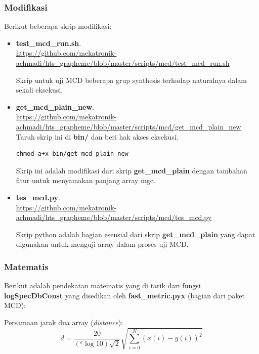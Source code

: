 \documentclass[12pt,]{article}
\begin{document}
	\newpage
	\subsubsection{Modifikasi}

	Berikut beberapa skrip modifikasi:
	\begin{itemize}
		\item \textbf{test\_mcd\_run.sh}.\\
		\url{https://github.com/mekatronik-achmadi/hts_grapheme/blob/master/scripts/mcd/test_mcd_run.sh}

		Skrip untuk uji MCD beberapa grup synthesis terhadap naturalnya dalam sekali eksekusi.

		\item \textbf{get\_mcd\_plain\_new}.\\
		\url{https://github.com/mekatronik-achmadi/hts_grapheme/blob/master/scripts/mcd/get_mcd_plain_new}
		Taruh skrip ini di \textbf{bin/} dan beri hak akses eksekusi.

		\begin{verbatim}
chmod a+x bin/get_mcd_plain_new
		\end{verbatim}

		Skrip ini adalah modifikasi dari skrip \textbf{get\_mcd\_plain} dengan tambahan fitur untuk menyamakan panjang array mgc.

		\item \textbf{tes\_mcd.py}.\\
		\url{https://github.com/mekatronik-achmadi/hts_grapheme/blob/master/scripts/mcd/tes_mcd.py}

		Skrip python adalah bagian esensial dari skrip \textbf{get\_mcd\_plain} yang dapat digunakan untuk menguji array dalam proses uji MCD.

	\end{itemize}

	\subsubsection{Matematis}

	Berikut adalah pendekatan matematis yang di tarik dari fungsi \textbf{logSpecDbConst} yang disedikan oleh \textbf{fast\_metric.pyx} (bagian dari paket MCD):

	Persamaan jarak dua array (\textit{distance}):
	\begin{equation}
		d = \frac{20}{({}^e\log 10)\sqrt{2}} \sqrt{ \sum_{i=0}^{N} ( x(i)-y(i) )^2 }
	\end{equation}
\end{document}

